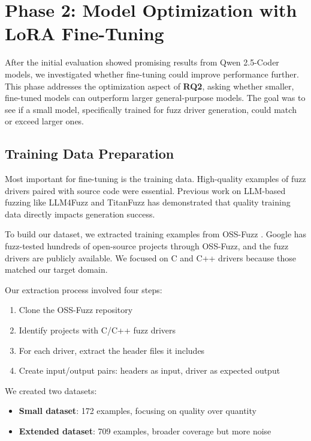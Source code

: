 \section{Phase 2: Model Optimization with LoRA Fine-Tuning}
\label{sec:impl_phase2}

After the initial evaluation showed promising results from Qwen 2.5-Coder models, we investigated whether fine-tuning could improve performance further. This phase addresses the optimization aspect of \textbf{RQ2}, asking whether smaller, fine-tuned models can outperform larger general-purpose models. The goal was to see if a small model, specifically trained for fuzz driver generation, could match or exceed larger ones.

\subsection{Training Data Preparation}

Most important for fine-tuning is the training data. High-quality examples of fuzz drivers paired with source code were essential. Previous work on LLM-based fuzzing like LLM4Fuzz \cite{llm4fuzz} and TitanFuzz \cite{TitanFuzz2022} has demonstrated that quality training data directly impacts generation success.

To build our dataset, we extracted training examples from OSS-Fuzz \cite{OSSFuzzBugs2021}. Google has fuzz-tested hundreds of open-source projects through OSS-Fuzz, and the fuzz drivers are publicly available. We focused on C and C++ drivers because those matched our target domain.

Our extraction process involved four steps:

\begin{enumerate}
    \item Clone the OSS-Fuzz repository
    \item Identify projects with C/C++ fuzz drivers
    \item For each driver, extract the header files it includes
    \item Create input/output pairs: headers as input, driver as expected output
\end{enumerate}

We created two datasets:
\begin{itemize}
    \item \textbf{Small dataset}: 172 examples, focusing on quality over quantity
    \item \textbf{Extended dataset}: 709 examples, broader coverage but more noise
\end{itemize}

